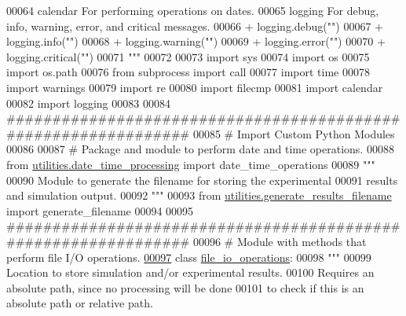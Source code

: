 \begin{DoxyCode}
00064 \textcolor{stringliteral}{    calendar    For performing operations on dates.}
00065 \textcolor{stringliteral}{    logging     For debug, info, warning, error, and critical messages.}
00066 \textcolor{stringliteral}{                + logging.debug("")}
00067 \textcolor{stringliteral}{                + logging.info("")}
00068 \textcolor{stringliteral}{                + logging.warning("")}
00069 \textcolor{stringliteral}{                + logging.error("")}
00070 \textcolor{stringliteral}{                + logging.critical("")}
00071 \textcolor{stringliteral}{"""}
00072 
00073 \textcolor{keyword}{import} sys
00074 \textcolor{keyword}{import} os
00075 \textcolor{keyword}{import} os.path
00076 \textcolor{keyword}{from} subprocess \textcolor{keyword}{import} call
00077 \textcolor{keyword}{import} time
00078 \textcolor{keyword}{import} warnings
00079 \textcolor{keyword}{import} re
00080 \textcolor{keyword}{import} filecmp
00081 \textcolor{keyword}{import} calendar
00082 \textcolor{keyword}{import} logging
00083 
00084 \textcolor{comment}{###############################################################}
00085 \textcolor{comment}{#   Import Custom Python Modules}
00086 
00087 \textcolor{comment}{# Package and module to perform date and time operations.}
00088 \textcolor{keyword}{from} \hyperlink{namespaceutilities_1_1date__time__processing}{utilities.date\_time\_processing} \textcolor{keyword}{import} date\_time\_operations
00089 \textcolor{stringliteral}{"""}
00090 \textcolor{stringliteral}{    Module to generate the filename for storing the experimental}
00091 \textcolor{stringliteral}{        results and simulation output.}
00092 \textcolor{stringliteral}{"""}
00093 \textcolor{keyword}{from} \hyperlink{namespaceutilities_1_1generate__results__filename}{utilities.generate\_results\_filename} \textcolor{keyword}{import} generate\_filename
00094 
00095 \textcolor{comment}{###############################################################}
00096 \textcolor{comment}{#   Module with methods that perform file I/O operations.}
\hypertarget{file__io_8py_source_l00097}{}\hyperlink{classutilities_1_1file__io_1_1file__io__operations}{00097} \textcolor{keyword}{class }\hyperlink{classutilities_1_1file__io_1_1file__io__operations}{file\_io\_operations}:
00098     \textcolor{stringliteral}{"""}
00099 \textcolor{stringliteral}{        Location to store simulation and/or experimental results.}
00100 \textcolor{stringliteral}{        Requires an absolute path, since no processing will be done}
00101 \textcolor{stringliteral}{            to check if this is an absolute path or relative path.}

\end{DoxyCode}
